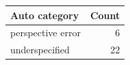 \begin{tabular}{lr}
\toprule
Auto category & Count \\
\midrule
perspective error & 6 \\
underspecified & 22 \\
\bottomrule
\end{tabular}
